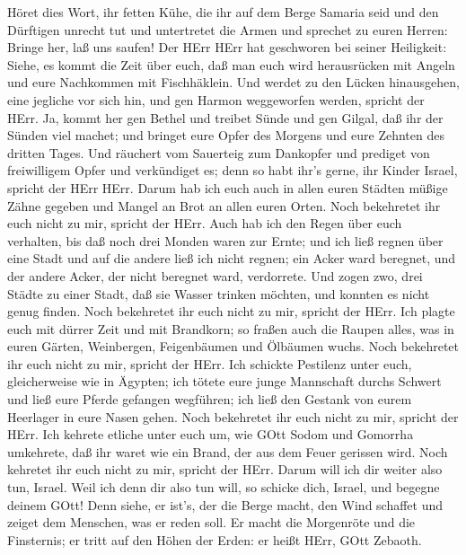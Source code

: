  Höret dies Wort, ihr fetten Kühe, die ihr auf dem Berge
Samaria seid und den Dürftigen unrecht tut und untertretet die Armen und
sprechet zu euren Herren: Bringe her, laß uns saufen!  Der
HErr HErr hat geschworen bei seiner Heiligkeit: Siehe, es kommt die Zeit
über euch, daß man euch wird herausrücken mit Angeln und eure Nachkommen
mit Fischhäklein.  Und werdet zu den Lücken hinausgehen,
eine jegliche vor sich hin, und gen Harmon weggeworfen werden, spricht
der HErr.  Ja, kommt her gen Bethel und treibet Sünde und
gen Gilgal, daß ihr der Sünden viel machet; und bringet eure Opfer des
Morgens und eure Zehnten des dritten Tages.  Und räuchert
vom Sauerteig zum Dankopfer und prediget von freiwilligem Opfer und
verkündiget es; denn so habt ihr's gerne, ihr Kinder Israel, spricht der
HErr HErr.  Darum hab ich euch auch in allen euren Städten
müßige Zähne gegeben und Mangel an Brot an allen euren Orten. Noch
bekehretet ihr euch nicht zu mir, spricht der HErr.  Auch
hab ich den Regen über euch verhalten, bis daß noch drei Monden waren
zur Ernte; und ich ließ regnen über eine Stadt und auf die andere ließ
ich nicht regnen; ein Acker ward beregnet, und der andere Acker, der
nicht beregnet ward, verdorrete.  Und zogen zwo, drei Städte
zu einer Stadt, daß sie Wasser trinken möchten, und konnten es nicht
genug finden. Noch bekehretet ihr euch nicht zu mir, spricht der HErr.
 Ich plagte euch mit dürrer Zeit und mit Brandkorn; so
fraßen auch die Raupen alles, was in euren Gärten, Weinbergen,
Feigenbäumen und Ölbäumen wuchs. Noch bekehretet ihr euch nicht zu mir,
spricht der HErr.  Ich schickte Pestilenz unter euch,
gleicherweise wie in Ägypten; ich tötete eure junge Mannschaft durchs
Schwert und ließ eure Pferde gefangen wegführen; ich ließ den Gestank
von eurem Heerlager in eure Nasen gehen. Noch bekehretet ihr euch nicht
zu mir, spricht der HErr.  Ich kehrete etliche unter euch
um, wie GOtt Sodom und Gomorrha umkehrete, daß ihr waret wie ein Brand,
der aus dem Feuer gerissen wird. Noch kehretet ihr euch nicht zu mir,
spricht der HErr.  Darum will ich dir weiter also tun,
Israel. Weil ich denn dir also tun will, so schicke dich, Israel, und
begegne deinem GOtt!  Denn siehe, er ist's, der die Berge
macht, den Wind schaffet und zeiget dem Menschen, was er reden soll. Er
macht die Morgenröte und die Finsternis; er tritt auf den Höhen der
Erden: er heißt HErr, GOtt Zebaoth.

